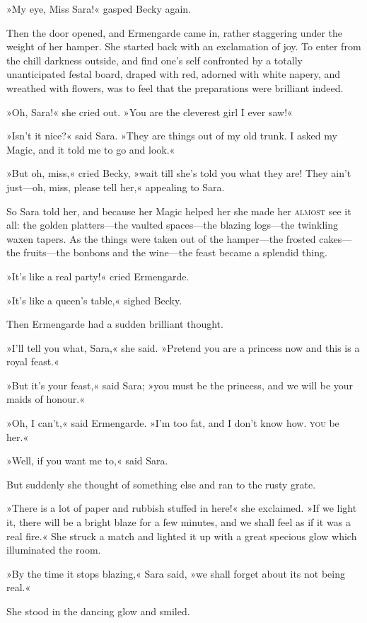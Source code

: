 »My eye, Miss Sara!« gasped Becky again.

Then the door opened, and Ermengarde came in, rather staggering under the weight of her hamper. She started back with an exclamation of joy. To enter from the chill darkness outside, and find one's self confronted by a totally unanticipated festal board, draped with red, adorned with white napery, and wreathed with flowers, was to feel that the preparations were brilliant indeed.

»Oh, Sara!« she cried out. »You are the cleverest girl I ever saw!«

»Isn't it nice?« said Sara. »They are things out of my old trunk. I asked my Magic, and it told me to go and look.«

»But oh, miss,« cried Becky, »wait till she's told you what they are! They ain't just—oh, miss, please tell her,« appealing to Sara.

So Sara told her, and because her Magic helped her she made her \textsc{almost} see it all: the golden platters—the vaulted spaces—the blazing logs—the twinkling waxen tapers. As the things were taken out of the hamper—the frosted cakes—the fruits—the bonbons and the wine—the feast became a splendid thing.

»It's like a real party!« cried Ermengarde.

»It's like a queen's table,« sighed Becky.

Then Ermengarde had a sudden brilliant thought.

»I'll tell you what, Sara,« she said. »Pretend you are a princess now and this is a royal feast.«

»But it's your feast,« said Sara; »you must be the princess, and we will be your maids of honour.«

»Oh, I can't,« said Ermengarde. »I'm too fat, and I don't know how. \textsc{you} be her.«

»Well, if you want me to,« said Sara.

But suddenly she thought of something else and ran to the rusty grate.

»There is a lot of paper and rubbish stuffed in here!« she exclaimed. »If we light it, there will be a bright blaze for a few minutes, and we shall feel as if it was a real fire.« She struck a match and lighted it up with a great specious glow which illuminated the room.

»By the time it stops blazing,« Sara said, »we shall forget about its not being real.«

She stood in the dancing glow and smiled.

